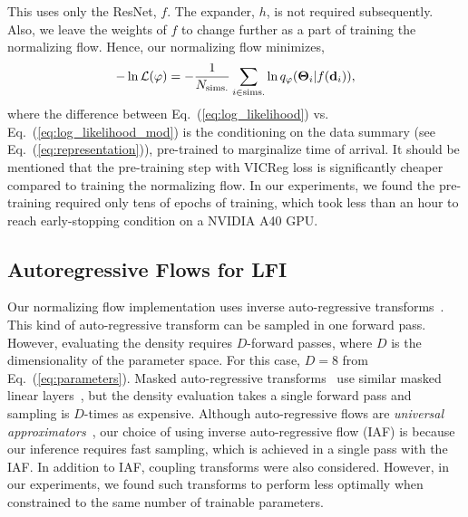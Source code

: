 \begin{refsection}
This uses only the ResNet, $f$. 
The expander, $h$, is not required subsequently. 
Also, we leave the weights of $f$ to change further as a part of training the normalizing flow. 
Hence, our normalizing flow minimizes,
\begin{equation}
    - \ln \mathcal{L}(\varphi) = - \frac{1}{N_{\mathrm{sims.}}}\sum_{i \in \mathrm{sims.}} \ln q_{\varphi}(\mathbf{\Theta}_i \vert f(\mathbf{d}_i)),
    \label{eq:log_likelihood_mod}
\end{equation}
where the difference between Eq.~(\ref{eq:log_likelihood}) vs. Eq.~(\ref{eq:log_likelihood_mod}) is the conditioning on the data summary (see Eq.~(\ref{eq:representation})), pre-trained to marginalize time of arrival. 
It should be mentioned that the pre-training step with VICReg loss is significantly cheaper compared to training the normalizing flow. 
In our experiments, we found the pre-training required only tens of epochs of training, which took less than an hour to reach early-stopping condition on a NVIDIA A40 GPU.

\subsection{\label{amp_meth_sec:normalizing-flow}Autoregressive Flows for LFI}
Our normalizing flow implementation uses inverse auto-regressive transforms~\cite{kingma2017improving}.
This kind of auto-regressive transform can be sampled in one forward pass. 
However, evaluating the density requires $D$-forward passes, where $D$ is the dimensionality of the parameter space.
For this case, $D=8$ from Eq.~(\ref{eq:parameters}). 
Masked auto-regressive transforms~\cite{papamakarios2018masked} use similar masked linear layers~\cite{pmlr-v37-germain15}, but the density evaluation takes a single forward pass and sampling is $D$-times as expensive. 
Although auto-regressive flows are \emph{universal approximators}~\cite{papamakarios2021normalizing}, our choice of using inverse auto-regressive flow (IAF) is because our inference requires fast sampling, which is achieved in a single pass with the IAF. 
In addition to IAF, coupling transforms were also considered. 
However, in our experiments, we found such transforms to perform less optimally when constrained to the same number of trainable parameters.


\end{refsection}
